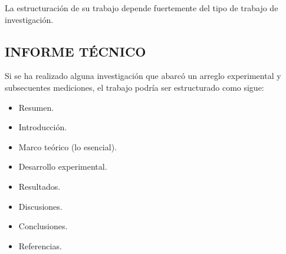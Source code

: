 La estructuración de su trabajo depende fuertemente del tipo de trabajo de investigación.
    \subsection{INFORME TÉCNICO} %
        Si se ha realizado alguna investigación que abarcó un arreglo experimental y subsecuentes mediciones, el trabajo podría ser estructurado como sigue:
            \begin{itemize} %
                \item Resumen.
                \item Introducción.
                \item Marco teórico (lo esencial).
                \item Desarrollo experimental.
                \item Resultados.
                \item Discusiones.
                \item Conclusiones.
                \item Referencias.
            \end{itemize}